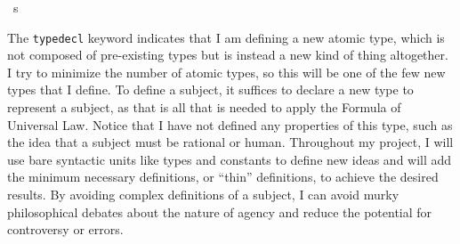 \begin{isabellebody}
\isamarkupfalse%
\ s\ %
%
\begin{isamarkuptext}%
The \texttt{typedecl} keyword indicates that I am defining a new atomic type, which is not composed
of pre-existing types but is instead a new kind of thing altogether. I try to minimize the number of 
atomic types, so this will be one of the few new types that I define. To define a subject, it suffices
to declare a new type to represent a subject, as that is all that is needed to apply the Formula of
Universal Law. Notice that I have not defined any properties of this type, such as the idea that a subject
must be rational or human. Throughout my project, I will use bare syntactic units like types and constants 
to define new ideas and will add the minimum necessary definitions, or ``thin'' definitions, to achieve the desired results.
By avoiding complex definitions of a subject, I can avoid murky philosophical debates about the nature
of agency and reduce the potential for controversy or errors. 


\end{isamarkuptext}
\end{isabellebody}
